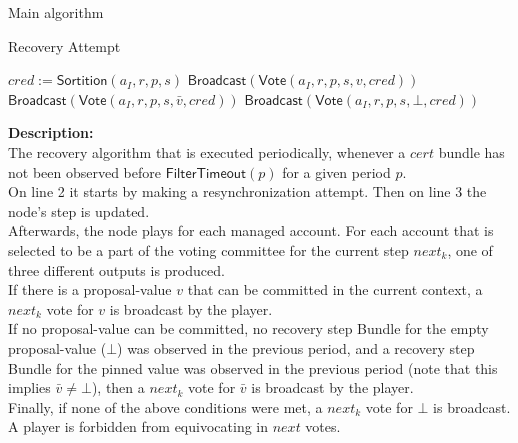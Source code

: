 \documentclass[10pt,a4paper]{article}
\begin{document}
\begin{section}{Main algorithm}
\begin{subsection}{Recovery Attempt}
\begin{algorithm}[H]
\begin{algorithmic}[1]
            \State $cred := \mathsf{\mathsf{Sortition}}(a_{I}, r,p,s)$
                    \State $\mathsf{Broadcast}(\mathsf{Vote}(a_I, r, p, s, v, cred))$
                    \State $\mathsf{Broadcast}(\mathsf{Vote}(a_I, r, p, s, \bar{v}, cred))$
                \Else
                    \State $\mathsf{Broadcast}(\mathsf{Vote}(a_I, r, p, s, \bot, cred))$
                \EndIf
            \EndIf
        \EndFor
        \EndFunction
        \end{algorithmic}
    \end{algorithm}
    
    
    \noindent \textbf{Description:}\\
The recovery algorithm that is executed periodically,
whenever a $cert$ bundle has not been observed before $\mathsf{FilterTimeout}(p)$ for a given period $p$. \\
On line 2 it starts by making a resynchronization attempt. Then on line 3 the node's step is updated.\\
Afterwards, the node plays for each managed account. For each account that is selected to be a part of the voting committee for the current
step $next_k$, one of three different outputs is produced. \\
If there is a proposal-value $v$ that can be committed in the current context, a $next_k$ vote for $v$ is broadcast by the player. \\
If no proposal-value can be committed, no recovery step Bundle for the empty proposal-value ($\bot$) was observed in the 
previous period, and a recovery step Bundle for the pinned value was observed in the previous period (note that this implies $\bar{v} \neq \bot$),
then a $next_k$ vote for $\bar{v}$ is broadcast by the player. \\
Finally, if none of the above conditions were met, a $next_k$ vote for $\bot$ is broadcast. A player is forbidden
from equivocating in $next$ votes.

\end{subsection}



\end{section}
\end{document}
